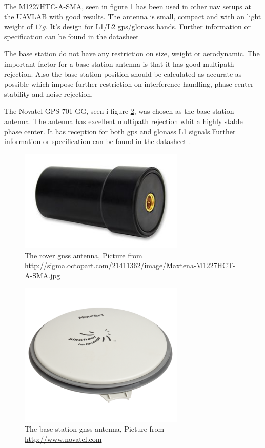 The M1227HTC-A-SMA, seen in figure \ref{figure:Maxtena} has been used in other \gls{uav} setups at the UAVLAB with good results. The antenna is small, compact and with an light weight of $17g$. It's design for L1/L2 gps/glonass bands. Further information or specification can be found in the datasheet \citep{maxtena}

The base station do not have any restriction on size, weight or aerodynamic. The important factor for a base station antenna is that it has good multipath rejection. Also the base station position should be calculated as accurate as possible which impose further restriction on interference handling, phase center stability and noise rejection.

The Novatel GPS-701-GG, seen i figure \ref{figure:Novatel}, was chosen as the base station antenna. The antenna has excellent multipath rejection whit a highly stable phase center. It has reception for both \gls{gps} and \gls{glonass} L1 signals.Further information or specification can be found in the datasheet \citep{novatel}.

\begin{figure}[H]
	\centering
		\includegraphics[width=0.7\textwidth]{figs/Maxtena-M1227HCT-A-SMA-image.jpg}
		\caption{The rover \gls{gnss} antenna, Picture from \url{http://sigma.octopart.com/21411362/image/Maxtena-M1227HCT-A-SMA.jpg}}
		\label{figure:Maxtena}
\end{figure}

\begin{figure}[H]
	\centering
		\includegraphics[width=0.7\textwidth]{figs/702-L.png}
		\caption{The base station \gls{gnss} antenna, Picture from \url{http://www.novatel.com}}
		\label{figure:Novatel}
\end{figure}


